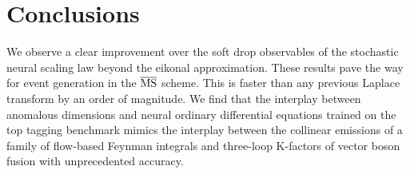 \section{Conclusions}\label{sec:conclusions}

We observe a clear improvement over the soft drop observables of the
stochastic neural scaling law beyond the eikonal approximation. These
results pave the way for event generation in the $\overline{\rm MS}$
scheme. This is faster than any previous Laplace transform by an order
of magnitude. We find that the interplay between anomalous dimensions
and neural ordinary differential equations trained on the top tagging
benchmark mimics the interplay between the collinear emissions of a
family of flow-based Feynman integrals and three-loop K-factors of
vector boson fusion with unprecedented accuracy.

